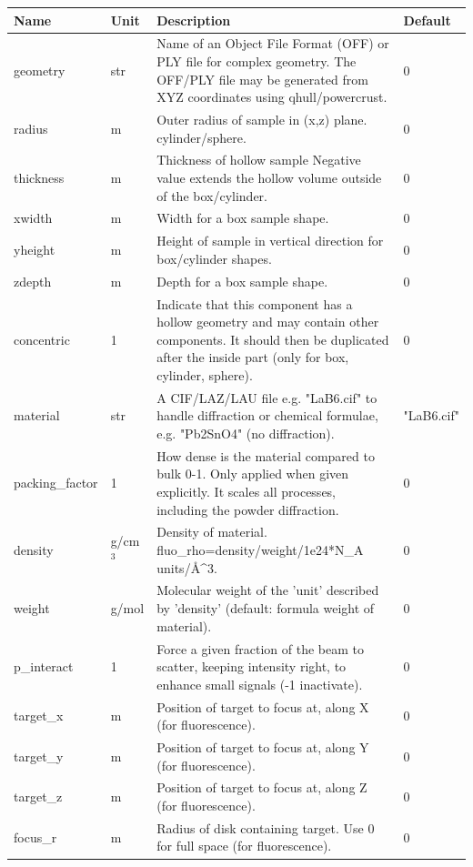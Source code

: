 \begin{longtable}{p{}p{}p{}p{}}
\toprule
\textbf{Name} & \textbf{Unit} & \textbf{Description} & \textbf{Default} \\
\midrule
\endhead
geometry & str & Name of an Object File Format (OFF) or PLY file for complex geometry. The OFF/PLY file may be generated from XYZ coordinates using qhull/powercrust. & 0 \\
radius & m & Outer radius of sample in (x,z) plane. cylinder/sphere. & 0 \\
thickness & m & Thickness of hollow sample Negative value extends the hollow volume outside of the box/cylinder. & 0 \\
xwidth & m & Width for a box sample shape. & 0 \\
yheight & m & Height of sample in vertical direction for box/cylinder shapes. & 0 \\
zdepth & m & Depth for a box sample shape. & 0 \\
concentric & 1 & Indicate that this component has a hollow geometry and may contain other components. It should then be duplicated after the inside part (only for box, cylinder, sphere). & 0 \\
material & str & A CIF/LAZ/LAU file e.g. "LaB6.cif" to handle diffraction or chemical formulae, e.g. "Pb2SnO4" (no diffraction). & "LaB6.cif" \\
packing\_factor & 1 & How dense is the material compared to bulk 0-1. Only applied when given explicitly. It scales all processes, including the powder diffraction. & 0 \\
density & g/cm$^{3}$ & Density of material. fluo\_rho=density/weight/1e24*N\_A units/\AA{}\textasciicircum{}3. & 0 \\
weight & g/mol & Molecular weight of the 'unit' described by 'density' (default: formula weight of material). & 0 \\
p\_interact & 1 & Force a given fraction of the beam to scatter, keeping intensity right, to enhance small signals (-1 inactivate). & 0 \\
target\_x & m & Position of target to focus at, along X (for fluorescence). & 0 \\
target\_y & m & Position of target to focus at, along Y (for fluorescence). & 0 \\
target\_z & m & Position of target to focus at, along Z (for fluorescence). & 0 \\
focus\_r & m & Radius of disk containing target. Use 0 for full space (for fluorescence). & 0 \\

\end{longtable}
